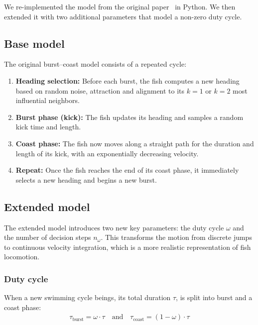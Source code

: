 We re-implemented the model from the original paper~\cite{Wang2025_fish} in Python.
We then extended it with two additional parameters that model a non-zero duty cycle.

\subsection{Base model}

The original burst–coast model consists of a repeated cycle:

\begin{enumerate}[itemsep=-1mm]
    \item \textbf{Heading selection:}
    Before each burst, the fish computes a new heading based on random noise, attraction and alignment to its $k=1$ or $k=2$ most influential neighbors.
    \item \textbf{Burst phase (kick):} The fish updates its heading and samples a random kick time and length.
    \item \textbf{Coast phase:} The fish now moves along a straight path for the duration and length of its kick, with an exponentially decreasing velocity.
    \item \textbf{Repeat:} Once the fish reaches the end of its coast phase, it immediately selects a new heading and begins a new burst.
\end{enumerate}

\subsection{Extended model}
The extended model introduces two new key parameters: the duty cycle $\omega$ and the number of decision steps $n_\omega$. This transforms the motion from discrete jumps to continuous velocity integration, which is a more realistic representation of fish locomotion.

\subsubsection{Duty cycle}

When a new swimming cycle beings, its total duration $\tau$, is split into burst and a coast phase:
\vspace{-5pt}
\begin{align*}
    \tau_{\text{burst}} = \omega \cdot \tau
    \quad\mathrm{and}\quad
    \tau_{\text{coast}} = (1 - \omega) \cdot \tau
\end{align*}

